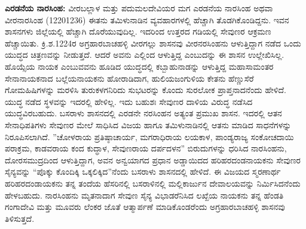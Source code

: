 \textbf{ಎರಡನೆಯ ನಾರಸಿಂಹ:} ವೀರಬಲ್ಲಾಳ ಮತ್ತು ಪದುಮಲದೇವಿಯರ ಮಗ ಎರಡನೆಯ ನಾರಸಿಂಹ ಅಥವಾ ವೀರನಾರಸಿಂಹ (12201236) ಈತನು ತಮಿಳುನಾಡಿನ ವ್ಯವಹಾರಗಳಲ್ಲಿ ಹೆಚ್ಚಾಗಿ ತೊಡಗಿಕೊಂಡಿದ್ದನು. ಇವನ ಶಾಸನಗಳು ಜಿಲ್ಲೆಯಲ್ಲಿ ಹೆಚ್ಚಾಗಿ ದೊರೆಯುವುದಿಲ್ಲ. ಇದರಿಂದ ಉತ್ತರದ ಗಡಿಯಲ್ಲಿ ಸೇವುಣರ ಆಕ್ರಮಣ ಹೆಚ್ಚಾಯಿತು. ಕ್ರಿ.ಶ.1224ರ ಅಗ್ರಹಾರಬಾಚಹಳ್ಳಿ ವೀರಗಲ್ಲು ಶಾಸನವು ವೀರನರಸಿಂಹನು ಆಳುತ್ತಿದ್ದಾಗ ನಡೆದ ಒಂದು ಯುದ್ಧದ ಚಿತ್ರಣವನ್ನು ನೀಡುತ್ತದೆ. ಆದರೆ ಅವನು ಎಲ್ಲಿಂದ ಆಳುತ್ತಿದ್ದ ಎಂಬುದನ್ನು ಈ ಶಾಸನ ಉಲ್ಲೇಖಿಸಿಲ್ಲ. ಹೊಯ್ಸೆಯ ನಾಯಕ ಎಂಬುವವನು ಹೂಡಿದ ಯುದ್ಧದಲ್ಲಿ ಕಬ್ಬಾಹುನಾಡನ್ನು ಆಳುತ್ತಿದ್ದ ಮಹಾಸಾಮಂತರ ಸೇನಾನಾಯಕನಾದ ಬಲ್ಲೆಯನಾಯಕನು ಹೋರಾಡಿದಾಗ, ಹುಲಿಯಜಂಗುಳಿಯ ಕೇತನು ಹೆಣ್ಣುಸೆರೆ ಗೋಮಹಿಷಿಗಳನ್ನು ಮರಳಿಸಿ ತುರುಕಳಗನಿರಿದು ಸುಭಟರನ್ನು ಕೊಂದು ಸುರಲೋಕ ಪ್ರಾಪ್ತನಾದನೆಂದು ಹೇಳಿದೆ. ಯುದ್ಧ ನಡೆದ ಸ್ಥಳವನ್ನು ಇದರಲ್ಲಿ ಹೇಳಿಲ್ಲ. ಇದು ಬಹುಶಃ ಸೇವುಣರ ದಾಳಿಯ ವಿರುದ್ಧ ನಡೆಸಿದ ಯುದ್ಧವಿರಬಹುದು. ಬಸರಾಳು ಶಾಸನದಲ್ಲಿ ಎರಡನೇ ನರಸಿಂಹನ ಅತ್ಯಂತ ಪ್ರಮುಖ ಶಾಸನ. ಇದರಲ್ಲಿ ಆತನ ಸೇನಾಧಿಪತಿಗಳು ಸೇವುಣರ ಮೇಲೆ ಸಾಧಿಸಿದ ವಿಜಯ ಹಾಗೂ ತಮಿಳುನಾಡಿನಲ್ಲಿ ಆತನು ಮಾಡಿದ ಸಾಧನೆಗಳನ್ನು ನಿರೂಪಿಸಲಾಗಿದೆ. ''ಚೋಳರಾಯ ಪ್ರತಿಷ್ಠಾಚಾರ್ಯ, ಮಗರಾಧಿರಾಯ ಲಯಕಾಳ, ಪಾಂಡ್ಯರಾಜ್ಯ ಸಂಕೋಚದಾಯಿ ಪರಾಕ್ರಮ, ಕಾಡವರಾಯ ಕಂದ ಕುದ್ಧಾಳ, ಸೇವುಣರಾಯ ದರ್ಪದಳನ'' ಬಿರುದುಗಳನ್ನು ಧರಿಸಿದ ನಾರಸಿಂಹನು, ದೋರಸಮುದ್ರದಿಂದ ಆಳುತ್ತಿದ್ದಾಗ, ಅವನ ಅನ್ವಯಾಗದ ಪ್ರಧಾನ ಅಡ್ಡಾಯಿದದ ಹರಿಹರದಂಡನಾಯಕನು ಸೇವುಣರ ಸೈನ್ಯವನ್ನು “ಪೊಕ್ಕು ಕೊಂದಿಕ್ಕಿ ಒಕ್ಕಲಿಕ್ಕಿದ”ನೆಂದು ಬಸರಾಳು ಶಾಸನದಲ್ಲಿ ಹೇಳಿದೆ. ಈ ವಿಜಯದ ಸ್ಮರಣಾರ್ಥ ಹರಿಹರದಂಡಾಯಕನು ತನ್ನ ತಂದೆಯ ಹೆಸರಿನಲ್ಲಿ ಬಸರಾಳಿನಲ್ಲಿ ಮಲ್ಲಿಕಾರ್ಜುನ ದೇವಾಲಯವನ್ನು ನಿರ್ಮಿಸಿದನೆಂದು ಹೇಳಬಹುದು. ನಾರಸಿಂಹನು ಮೃತನಾದಾಗ ಸೇವುಣ ಸೈನ್ಯ ವಿಭಾಡರೆನಿಸಿದ ಲಖ್ಖೆಯ ನಾಯಕನು ತನ್ನ ಹೆಂಡತಿ ಗಂಗಾದೇವಿ ಮತ್ತು ಮೂವರು ಲೆಂಕರ ಜೊತೆ ಆತ್ಮಾರ್ಪಣೆ ಮಾಡಿಕೊಂಡರೆಂದು ಅಗ್ರಹಾರಬಾಚಹಳ್ಳಿ ಶಾಸನವು ತಿಳಿಸುತ್ತದೆ.

